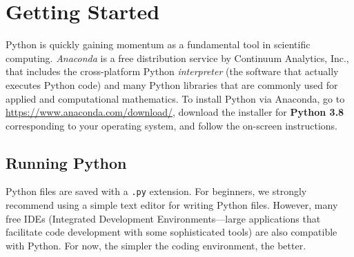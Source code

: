 \label{lab:Python_Intro}

\section*{Getting Started} %

Python is quickly gaining momentum as a fundamental tool in scientific computing.
\emph{Anaconda} is a free distribution service by Continuum Analytics, Inc., that includes the cross-platform Python \emph{interpreter} (the software that actually executes Python code) and many Python libraries that are commonly used for applied and computational mathematics.
To install Python via Anaconda, go to \url{https://www.anaconda.com/download/}, download the installer for \textbf{Python 3.8} corresponding to your operating system, and follow the on-screen instructions.

\subsection*{Running Python} %

Python files are saved with a \texttt{.py} extension.
For beginners, we strongly recommend using a simple text editor for writing Python files.
However, many free IDEs (Integrated Development Environments---large applications that facilitate code development with some sophisticated tools) are also compatible with Python.
For now, the simpler the coding environment, the better.

